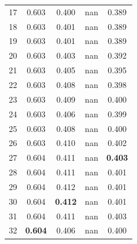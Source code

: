 \documentclass[11pt,a4paper]{article}
\begin{document}
\begin{table}[H]
\begin{tabular}{rcccc}
17 & 0.603 & 0.400 & nan & 0.389 \\

18 & 0.603 & 0.401 & nan & 0.389 \\

19 & 0.603 & 0.401 & nan & 0.389 \\

20 & 0.603 & 0.403 & nan & 0.392 \\

21 & 0.603 & 0.405 & nan & 0.395 \\

22 & 0.603 & 0.408 & nan & 0.398 \\

23 & 0.603 & 0.409 & nan & 0.400 \\

24 & 0.603 & 0.406 & nan & 0.399 \\

25 & 0.603 & 0.408 & nan & 0.400 \\

26 & 0.603 & 0.410 & nan & 0.402 \\

27 & 0.604 & 0.411 & nan & \textbf{0.403} \\

28 & 0.604 & 0.411 & nan & 0.401 \\

29 & 0.604 & 0.412 & nan & 0.401 \\

30 & 0.604 & \textbf{0.412} & nan & 0.401 \\

31 & 0.604 & 0.411 & nan & 0.403 \\

32 & \textbf{0.604} & 0.406 & nan & 0.400 \\

\bottomrule

\end{tabular}

\end{table}
\end{document}
